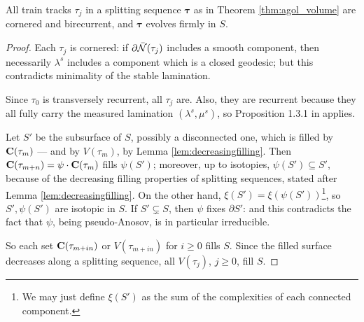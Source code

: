 \begin{lemma}
All train tracks $\tau_j$ in a splitting sequence $\bm\tau$ as in Theorem \ref{thm:agol_volume} are cornered and birecurrent, and $\bm\tau$ evolves firmly in $S$.
\end{lemma}
\begin{proof}
Each $\tau_j$ is cornered: if $\partial\bar{{\mathcal N}}(\tau_j)$ includes a smooth component, then necessarily $\lambda^s$ includes a component which is a closed geodesic; but this contradicts minimality of the stable lamination.

Since $\tau_0$ is transversely recurrent, all $\tau_j$ are. Also, they are recurrent because they all fully carry the measured lamination $(\lambda^s,\mu^s)$, so Proposition 1.3.1 in \cite{penner} applies.

Let $S'$ be the subsurface of $S$, possibly a disconnected one, which is filled by $\mathbf C(\tau_m)$ --- and by $V(\tau_m)$, by Lemma \ref{lem:decreasingfilling}. Then $\mathbf C(\tau_{m+n})=\psi\cdot\mathbf C(\tau_m)$ fills $\psi(S')$; moreover, up to isotopies, $\psi(S')\subseteq S'$, because of the decreasing filling properties of splitting sequences, stated after Lemma \ref{lem:decreasingfilling}. On the other hand, $\xi(S')=\xi\left(\psi(S')\right)$\footnote{We may just define $\xi(S')$ as the sum of the complexities of each connected component.}, so $S',\psi(S')$ are isotopic in $S$. If $S'\subsetneq S$, then $\psi$ fixes $\partial S'$: and this contradicts the fact that $\psi$, being pseudo-Anosov, is in particular irreducible.

So each set $\mathbf C(\tau_{m+in})$ or $V(\tau_{m+in})$ for $i\geq 0$ fills $S$. Since the filled surface decreases along a splitting sequence, all $V(\tau_j)$, $j\geq 0$, fill $S$.
\end{proof}

